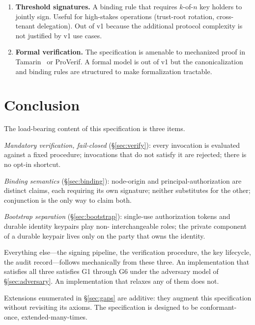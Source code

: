 \documentclass[11pt,a4paper]{article}
\begin{document}
\begin{enumerate}[leftmargin=2em,itemsep=0.3em]
    \item \textbf{Threshold signatures.} A binding rule that requires
    $k$-of-$n$ key holders to jointly sign. Useful for high-stakes
    operations (trust-root rotation, cross-tenant delegation). Out of
    v1 because the additional protocol complexity is not justified by
    v1 use cases.

    \item \textbf{Formal verification.} The specification is amenable
    to mechanized proof in Tamarin~\cite{tamarin} or ProVerif. A
    formal model is out of v1 but the canonicalization and binding
    rules are structured to make formalization tractable.
\end{enumerate}

\section{Conclusion}

The load-bearing content of this specification is three items.

\emph{Mandatory verification, fail-closed} (\S\ref{sec:verify}):
every invocation is evaluated against a fixed procedure; invocations
that do not satisfy it are rejected; there is no opt-in shortcut.

\emph{Binding semantics} (\S\ref{sec:binding}): node-origin and
principal-authorization are distinct claims, each requiring its own
signature; neither substitutes for the other; conjunction is the only
way to claim both.

\emph{Bootstrap separation} (\S\ref{sec:bootstrap}): single-use
authorization tokens and durable identity keypairs play non-
interchangeable roles; the private component of a durable keypair
lives only on the party that owns the identity.

Everything else---the signing pipeline, the verification procedure,
the key lifecycle, the audit record---follows mechanically from these
three. An implementation that satisfies all three satisfies
G1 through G6 under the adversary model of \S\ref{sec:adversary}.
An implementation that relaxes any of them does not.

Extensions enumerated in \S\ref{sec:gaps} are additive: they augment
this specification without revisiting its axioms. The specification
is designed to be conformant-once, extended-many-times.
\end{document}
